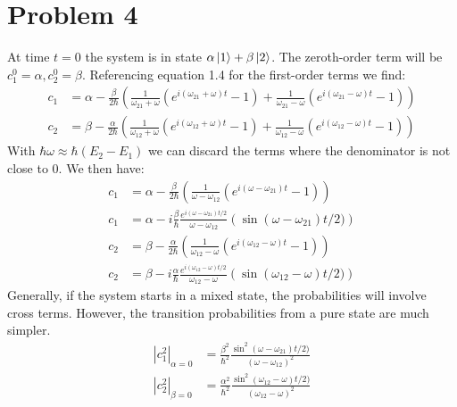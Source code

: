 \documentclass[a4paper,11pt]{article}
\numberwithin{equation}{section}
\begin{document}
\section{Problem 4}
At time $t=0$ the system is in state $\alpha\ket{1}+\beta\ket{2}$.
The zeroth-order term will be $c_1^0=\alpha,c_2^0=\beta$.
Referencing equation 1.4 for the first-order terms we find:
\begin{align}
  c_1 &= \alpha-\frac{\beta}{2\hbar}\left(\frac{1}{\omega_{21}+\omega}(e^{i(\omega_{21}+\omega)t}-1)+ 
	\frac{1}{\omega_{21}-\omega}(e^{i(\omega_{21}-\omega)t}-1)\right)\\
 c_2 &= \beta-\frac{\alpha}{2\hbar}\left(\frac{1}{\omega_{12}+\omega}(e^{i(\omega_{12}+\omega)t}-1)+ 
	\frac{1}{\omega_{12}-\omega}(e^{i(\omega_{12}-\omega)t}-1)\right)
\end{align}
With $\hbar\omega \approx \hbar(E_2-E_1)$ we can discard the terms where the denominator is not close to 0.
We then have:
\begin{align}
 c_1 &= \alpha-\frac{\beta}{2\hbar}\left(\frac{1}{\omega-\omega_{12}}(e^{i(\omega-\omega_{21})t}-1)\right)\\
 c_1 &= \alpha-i\frac{\beta}{\hbar}\frac{e^{i(\omega-\omega_{21})t/2}}{\omega-\omega_{12}} (\sin{(\omega-\omega_{21})t/2)})\\
 c_2 &= \beta-\frac{\alpha}{2\hbar}\left(\frac{1}{\omega_{12}-\omega}(e^{i(\omega_{12}-\omega)t}-1)\right)\\
 c_2 &= \beta-i\frac{\alpha}{\hbar}\frac{e^{i(\omega_{12}-\omega)t/2}}{\omega_{12}-\omega} (\sin{(\omega_{12}-\omega)t/2)})
\end{align}
Generally, if the system starts in a mixed state, the probabilities will involve cross terms. 
However, the transition probabilities from a pure state are much simpler.
\begin{align}
 |c_1^2|_{\alpha=0} &= \frac{\beta^2}{\hbar^2}\frac{\sin^2{(\omega-\omega_{21})t/2)}}{(\omega-\omega_{12})^2}\\
 |c_2^2|_{\beta=0} &= \frac{\alpha^2}{\hbar^2}\frac{\sin^2{(\omega_{12}-\omega)t/2)}}{(\omega_{12}-\omega)^2}
\end{align}
\
\end{document}
